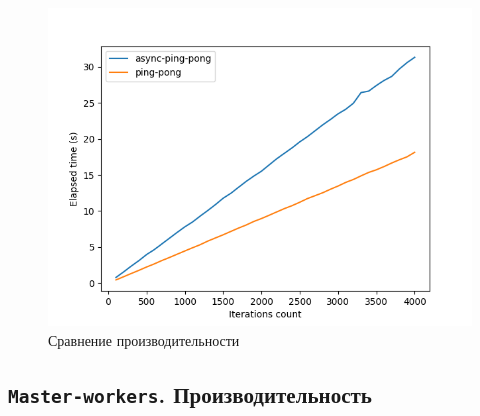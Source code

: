 \documentclass[t]{beamer}  %
\begin{document}
 \begin{frame}[fragile]
	\frametitle{\insertsection} 
	\framesubtitle{\insertsubsection}
	\vspace{-0.4cm}
	\begin{figure}
		\includegraphics[width=0.8\linewidth]{images/async-ping-pong}
		\caption*{Сравнение производительности}
	\end{figure}
 \end{frame}



 \subsection{\texttt{Master-workers}. Производительность}
\end{document}
